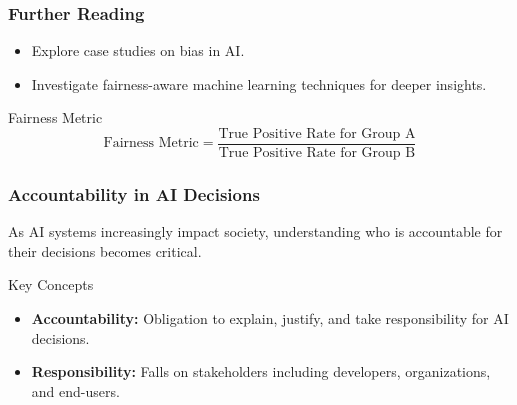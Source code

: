 \documentclass[aspectratio=169]{beamer}
\begin{document}
\begin{frame}[fragile]
    \frametitle{Further Reading}
    
    \begin{itemize}
        \item Explore case studies on bias in AI.
        \item Investigate fairness-aware machine learning techniques for deeper insights.
    \end{itemize}
    
    \begin{block}{Fairness Metric}
        \begin{equation}
            \text{Fairness Metric} = \frac{\text{True Positive Rate for Group A}}{\text{True Positive Rate for Group B}}
        \end{equation}
    \end{block}
\end{frame}

\begin{frame}[fragile]
    \frametitle{Accountability in AI Decisions}
    As AI systems increasingly impact society, understanding who is accountable for their decisions becomes critical.

    \begin{block}{Key Concepts}
        \begin{itemize}
            \item \textbf{Accountability:} Obligation to explain, justify, and take responsibility for AI decisions.
            \item \textbf{Responsibility:} Falls on stakeholders including developers, organizations, and end-users.
        \end{itemize}
    \end{block}
\end{frame}
\end{document}
